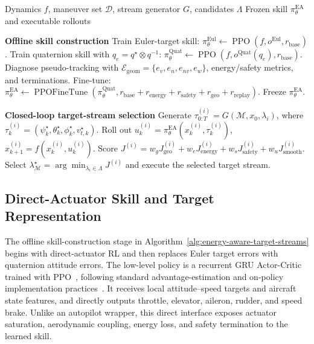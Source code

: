 \documentclass{article}
\begin{document}
\begin{algorithm}[!t]
\footnotesize
\caption{Energy-Aware Target Streams}
\label{alg:energy-aware-target-streams}
\begin{algorithmic}[1]
\Require Dynamics $f$, maneuver set $\mathcal{D}$, stream generator $G$, candidates $\Lambda$
\Ensure Frozen skill $\pi_{\theta}^{\mathrm{EA}}$ and executable rollouts

\Statex \textbf{Offline skill construction}
\State Train Euler-target skill:
$\pi_{\theta}^{\mathrm{Eul}}\!\leftarrow\!\operatorname{PPO}(f,o^{\mathrm{Eul}},r_{\mathrm{base}})$.
\State Train quaternion skill with $q_e=q^\star\!\otimes q^{-1}$:
$\pi_{\theta}^{\mathrm{Quat}}\!\leftarrow\!\operatorname{PPO}(f,o^{\mathrm{Quat}}(q_e),r_{\mathrm{base}})$.
\State Diagnose pseudo-tracking with $\mathcal{E}_{\mathrm{geom}}=\{e_v,e_n,e_{nv},e_w\}$, energy/safety metrics, and terminations.
\State Fine-tune:
$\pi_{\theta}^{\mathrm{EA}}\!\leftarrow\!\operatorname{PPOFineTune}(\pi_{\theta}^{\mathrm{Quat}},r_{\mathrm{base}}+r_{\mathrm{energy}}+r_{\mathrm{safety}}+r_{\mathrm{geo}}+r_{\mathrm{replay}})$.
\State Freeze $\pi_{\theta}^{\mathrm{EA}}$.

\Statex \textbf{Closed-loop target-stream selection}
    \State Generate $\tau_{0:T}^{(i)}=G(\mathcal{M},x_0,\lambda_i)$, where $\tau_k^{(i)}=(\psi_k^\star,\theta_k^\star,\phi_k^\star,v_{t,k}^{\star})$.
    \State Roll out $u_k^{(i)}=\pi_{\theta}^{\mathrm{EA}}(x_k^{(i)},\tau_k^{(i)})$, $x_{k+1}^{(i)}=f(x_k^{(i)},u_k^{(i)})$.
    \State Score $J^{(i)}=w_gJ_{\mathrm{geo}}^{(i)}+w_eJ_{\mathrm{energy}}^{(i)}+w_sJ_{\mathrm{safety}}^{(i)}+w_uJ_{\mathrm{smooth}}^{(i)}$.
  \EndFor
  \State Select $\lambda_{\mathcal{M}}^\star=\arg\min_{\lambda_i\in\Lambda}J^{(i)}$ and execute the selected target stream.
\EndFor
\end{algorithmic}
\end{algorithm}

\subsection{Direct-Actuator Skill and Target Representation}

The offline skill-construction stage in Algorithm~\ref{alg:energy-aware-target-streams} begins with direct-actuator RL and then replaces Euler target errors with quaternion attitude errors.
The low-level policy is a recurrent GRU Actor-Critic trained with PPO~\citep{schulman2017ppo}, following standard advantage-estimation and on-policy implementation practices~\citep{schulman2016gae,andrychowicz2021matters}.
It receives local attitude--speed targets and aircraft state features, and directly outputs throttle, elevator, aileron, rudder, and speed brake.
Unlike an autopilot wrapper, this direct interface exposes actuator saturation, aerodynamic coupling, energy loss, and safety termination to the learned skill.
\end{document}
